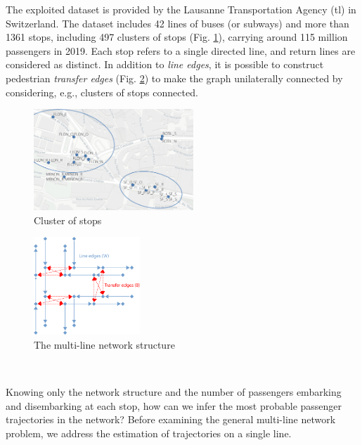 \documentclass{bmcart}
\begin{document}
The exploited dataset is provided by the Lausanne Transportation Agency (tl) in Switzerland. The dataset includes 42 lines of buses (or subways) and more than 1361 stops, including 497 clusters of stops (Fig. \ref{fig:map-lausanne}),  carrying around 115 million passengers in 2019. Each stop refers to a single directed line, and return lines are considered as distinct.  In addition to  \emph{line edges},  it is possible to construct pedestrian \emph{transfer edges} (Fig. \ref{fig:network-lausanne}) to make the graph unilaterally connected by considering, e.g., clusters of stops connected.

\noindent \begin{minipage}[c]{0.5\textwidth}
   \begin{figure}[H]
      \centering
      \includegraphics[width=6cm]{img/stop_area_c.png}
      \caption{Cluster of stops} 
      \label{fig:map-lausanne}
   \end{figure}
\end{minipage}%
\begin{minipage}[c]{0.5\textwidth}
   \begin{figure}[H]
      \centering
      \includegraphics[width=4cm]{img/edge_type3.png}
      \caption{The multi-line network structure} 
      \label{fig:network-lausanne}
   \end{figure}
\end{minipage}


$\mbox{}$

Knowing only the network structure and the number of passengers embarking and disembarking at each stop, how can we infer the most probable passenger trajectories in the network? Before examining the general multi-line network problem,  we address the estimation of trajectories on a single line.
\end{document}
